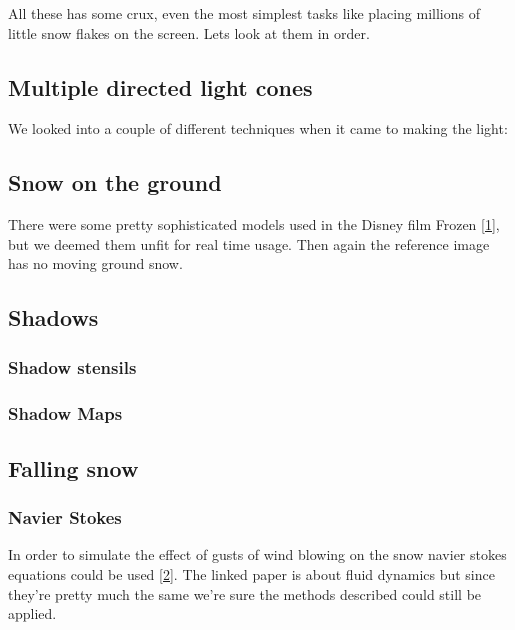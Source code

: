 \documentclass[a4paper,12pt]{article}
\begin{document}
All these has some crux, even the most simplest tasks like placing millions of little snow flakes on the screen. Lets look at them in order.


\subsection{Multiple directed light cones}

We looked into a couple of different techniques when it came to making the light:


\subsection{Snow on the ground}

There were some pretty sophisticated models used in the Disney film Frozen \href{https://disney-animation.s3.amazonaws.com/uploads/production/publication_asset/94/asset/SSCTS13_2.pdf}{[1]}, but we deemed them unfit for real time usage. Then again the reference image has no moving ground snow.


\subsection{Shadows}


\subsubsection{Shadow stensils}

\subsubsection{Shadow Maps}



\subsection{Falling snow}

\subsubsection{Navier Stokes}

In order to simulate the effect of gusts of wind blowing on the snow navier stokes equations could be used \href{http://www.intpowertechcorp.com/GDC03.pdf}{[2]}. The linked paper is about fluid dynamics but since they're pretty much the same we're sure the methods described could still be applied.
\end{document}
